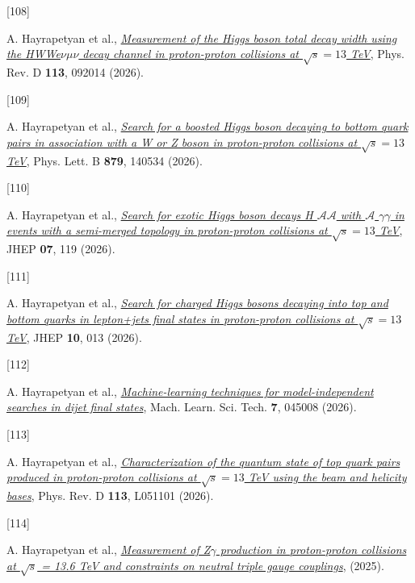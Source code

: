 \documentclass[
]{article}
\newlength{\cslhangindent}
\newlength{\csllabelwidth}
\newenvironment{CSLReferences}[2] %
 {\begin{list}{}{%
  \setlength{\itemindent}{0pt}
  \setlength{\leftmargin}{0pt}
  \setlength{\parsep}{0pt}
  \ifodd #1
   \setlength{\leftmargin}{\cslhangindent}
   \setlength{\itemindent}{-1\cslhangindent}
  \fi
  \setlength{\itemsep}{#2\baselineskip}}}
 {\end{list}}
\newcommand{\CSLLeftMargin}[1]{\parbox[t]{\csllabelwidth}{\strut#1\strut}}
\newcommand{\CSLRightInline}[1]{\parbox[t]{\linewidth - \csllabelwidth}{\strut#1\strut}}
\begin{document}
\begin{CSLReferences}{0}{0}
\CSLLeftMargin{{[}108{]} }%
\CSLRightInline{A. Hayrapetyan et al.,
\emph{\href{https://doi.org/10.1103/rny9-zby1}{{Measurement of the Higgs
boson total decay width using the
H{\textrightarrow}WW{\textrightarrow}e{\(\nu\)}{\(\mu\)}{\(\nu\)} decay
channel in proton-proton collisions at \(\sqrt{s}=13\) TeV}}}, Phys.
Rev. D \textbf{113}, 092014 (2026).}

\CSLLeftMargin{{[}109{]} }%
\CSLRightInline{A. Hayrapetyan et al.,
\emph{\href{https://doi.org/10.1016/j.physletb.2026.140534}{{Search for
a boosted Higgs boson decaying to bottom quark pairs in association with
a W or Z boson in proton-proton collisions at \(\sqrt{s}=13\) TeV}}},
Phys. Lett. B \textbf{879}, 140534 (2026).}

\CSLLeftMargin{{[}110{]} }%
\CSLRightInline{A. Hayrapetyan et al.,
\emph{\href{https://doi.org/10.1007/JHEP07(2026)119}{{Search for exotic
Higgs boson decays H {\textrightarrow}
{\(\mathscr{A}\)}{\(\mathscr{A}\)} with {\(\mathscr{A}\)}
{\textrightarrow} {\(\gamma\)}{\(\gamma\)} in events with a semi-merged
topology in proton-proton collisions at \(\sqrt{s}=13\) TeV}}}, JHEP
\textbf{07}, 119 (2026).}

\CSLLeftMargin{{[}111{]} }%
\CSLRightInline{A. Hayrapetyan et al.,
\emph{\href{https://doi.org/10.1007/JHEP10(2026)013}{{Search for charged
Higgs bosons decaying into top and bottom quarks in lepton+jets final
states in proton-proton collisions at \(\sqrt{s}=13\) TeV}}}, JHEP
\textbf{10}, 013 (2026).}

\CSLLeftMargin{{[}112{]} }%
\CSLRightInline{A. Hayrapetyan et al.,
\emph{\href{https://doi.org/10.1088/2632-2153/ae7d87}{{Machine-learning
techniques for model-independent searches in dijet final states}}},
Mach. Learn. Sci. Tech. \textbf{7}, 045008 (2026).}

\CSLLeftMargin{{[}113{]} }%
\CSLRightInline{A. Hayrapetyan et al.,
\emph{\href{https://doi.org/10.1103/hkgw-dztk}{{Characterization of the
quantum state of top quark pairs produced in proton-proton collisions at
\(\sqrt{s}=13\) TeV using the beam and helicity bases}}}, Phys. Rev. D
\textbf{113}, L051101 (2026).}

\CSLLeftMargin{{[}114{]} }%
\CSLRightInline{A. Hayrapetyan et al.,
\emph{\href{https://arxiv.org/abs/2512.08582}{{Measurement of Z\(\ensuremath{\gamma}\)
production in proton-proton collisions at \(\sqrt{s}\) = 13.6 TeV and
constraints on neutral triple gauge couplings}}}, (2025).}


\end{CSLReferences}
\end{document}
